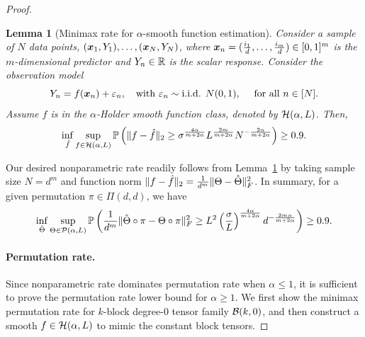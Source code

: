 \documentclass[11pt]{article}
\newtheorem{lem}{Lemma}
\theoremstyle{definition}
\begin{document}
\begin{proof}
\begin{lem}[Minimax rate for $\alpha$-smooth function estimation]\label{lem:non} Consider a sample of $N$ data points, $(\bm x_1,Y_1), \ldots, (\bm x_N,Y_N)$, where $\bm x_n=({i_1\over d},\ldots,{i_m\over d})\in[0,1]^m$ is the $m$-dimensional predictor and $Y_n\in\mathbb{R}$ is the scalar response. Consider the observation model
\[
Y_n=f(\mx_n)+\varepsilon_n,\quad \text{with}\ \varepsilon_n \sim \text{i.i.d. }  N(0,1), \quad\text{ for all }n\in[N].
\]
Assume $f$ is in the $\alpha$-Holder smooth function class, denoted by $\mathcal{H}(\alpha,L)$. Then,
\begin{equation}
\inf_{\hat f}\sup_{f\in \mathcal{H}(\alpha,L)}\mathbb{P}\left(\lVert f-\hat f\rVert_2\geq \sigma^{4\alpha\over m+2\alpha}L^{2m\over m+2\alpha} N^{-{2\alpha\over m+2\alpha}}\right)\geq 0.9.
\end{equation}
\end{lem}
Our desired nonparametric rate readily follows from Lemma~\ref{lem:non} by taking sample size $N=d^m$ and function norm $\lVert f-\hat f\rVert_2={1\over d^m}\lVert\Theta-\hat \Theta\rVert_F^2$. In summary, for a given permutation $\pi\in\Pi(d,d)$, we have
\begin{align}\label{eq:non}
\inf_{\hat \Theta}\sup_{\Theta\in \mathcal{P}(\alpha,L)}\mathbb{P}\left({1\over d^m}\lVert\hat \Theta\circ \pi-\Theta\circ \pi\rVert_F^2\geq L^2\left(\sigma\over L\right)^{4\alpha\over m+2\alpha} d^{-{2m\alpha\over m+2\alpha}}\right) \geq 0.9.
\end{align}



\paragraph{Permutation rate.}
Since nonparametric rate dominates permutation rate when $\alpha\leq 1$, it is sufficient to prove the permutation rate lower bound for $\alpha\geq 1.$
We first show the minimax permutation rate for $k$-block degree-$0$ tensor family $\mathcal{B}(k,0)$, and then construct a smooth $f\in\mathcal{H}(\alpha,L)$ to mimic the constant block tensors. 


\end{proof}
\end{document}
